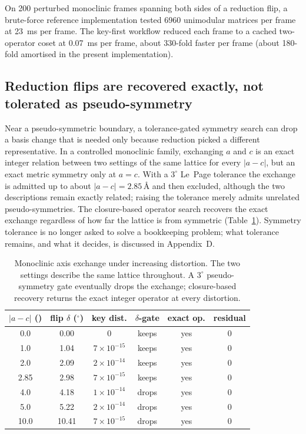 \documentclass[11pt]{article}
\newcommand{\Ang}{\text{\AA}}
\begin{document}
On 200 perturbed monoclinic frames spanning both sides of a reduction flip, a brute-force reference implementation tested 6960 unimodular matrices per frame at \SI{23}{\milli\second} per frame. The key-first workflow reduced each frame to a cached two-operator coset at \SI{0.07}{\milli\second} per frame, about 330-fold faster per frame (about 180-fold amortised in the present implementation).

\subsection{Reduction flips are recovered exactly, not tolerated as pseudo-symmetry}

Near a pseudo-symmetric boundary, a tolerance-gated symmetry search can drop a basis change that is needed only because reduction picked a different representative. In a controlled monoclinic family, exchanging $a$ and $c$ is an exact integer relation between two settings of the same lattice for every $|a-c|$, but an exact metric symmetry only at $a=c$. With a $3^\circ$ Le~Page tolerance the exchange is admitted up to about $|a-c|=2.85\,\Ang$ and then excluded, although the two descriptions remain exactly related; raising the tolerance merely admits unrelated pseudo-symmetries. The closure-based operator search recovers the exact exchange regardless of how far the lattice is from symmetric (Table~\ref{tab:flip}). Symmetry tolerance is no longer asked to solve a bookkeeping problem; what tolerance remains, and what it decides, is discussed in Appendix~D.

\begin{table}[t]
\centering
\caption{Monoclinic axis exchange under increasing distortion. The two settings describe the same lattice throughout. A $3^\circ$ pseudo-symmetry gate eventually drops the exchange; closure-based recovery returns the exact integer operator at every distortion.}
\label{tab:flip}
\begin{tabular}{cccccc}
\toprule
$|a-c|$ (\Ang) & flip $\delta$ ($^\circ$) & key dist. & $\delta$-gate & exact op. & residual \\
\midrule
0.0  & 0.00  & $0$ & keeps & yes & $0$ \\
1.0  & 1.04  & $7\times10^{-15}$ & keeps & yes & $0$ \\
2.0  & 2.09  & $2\times10^{-14}$ & keeps & yes & $0$ \\
2.85 & 2.98  & $7\times10^{-15}$ & keeps & yes & $0$ \\
4.0  & 4.18  & $1\times10^{-14}$ & drops & yes & $0$ \\
5.0  & 5.22  & $2\times10^{-14}$ & drops & yes & $0$ \\
10.0 & 10.41 & $7\times10^{-15}$ & drops & yes & $0$ \\
\bottomrule
\end{tabular}
\end{table}
\end{document}
